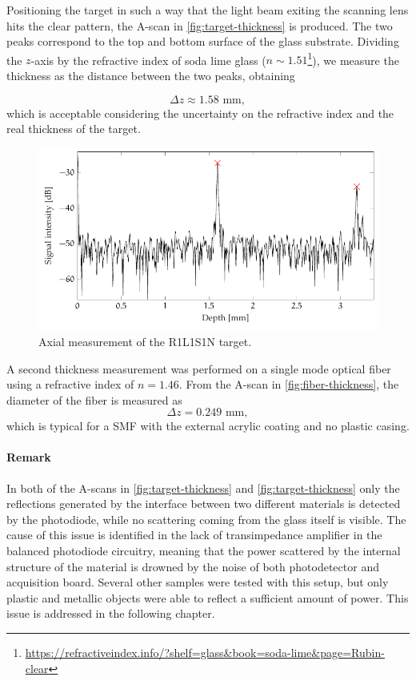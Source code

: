 Positioning the target in such a way that the light beam exiting the scanning lens hits the clear pattern, the A-scan in \autoref{fig:target-thickness} is produced. The two peaks correspond to the top and bottom surface of the glass substrate. Dividing the $z$-axis by the refractive index of soda lime glass ($n \sim 1.51$\footnote{\url{https://refractiveindex.info/?shelf=glass&book=soda-lime&page=Rubin-clear}}), we measure the thickness as the distance between the two peaks, obtaining

\begin{equation}
	\Delta z \approx 1.58 \text{ mm},
\end{equation}
which is acceptable considering the uncertainty on the refractive index and the real thickness of the target. 
\begin{figure}[hbt]
	\myfloatalign
	\includegraphics[width=\linewidth]{gfx/tikz/thickness-measure/target-thickness}
	\caption{Axial measurement of the R1L1S1N target.}\label{fig:target-thickness}
\end{figure}

A second thickness measurement was performed on a single mode optical fiber using a refractive index of $n=1.46$. From the A-scan in \autoref{fig:fiber-thickness}, the diameter of the fiber is measured as
\begin{equation}
\Delta z = 0.249 \text{ mm},
\end{equation}
which is typical for a \ac{SMF} with the external acrylic coating and no plastic casing. 

\paragraph{Remark} In both of the A-scans in \autoref{fig:target-thickness} and \autoref{fig:target-thickness} only the reflections generated by the interface between two different materials is detected by the photodiode, while no scattering coming from the glass itself is visible. The cause of this issue is identified in the lack of transimpedance amplifier in the balanced photodiode circuitry, meaning that the power scattered by the internal structure of the material is drowned by the noise of both photodetector and acquisition board. Several other samples were tested with this setup, but only plastic and metallic objects were able to reflect a sufficient amount of power. This issue is addressed in the following chapter.  



